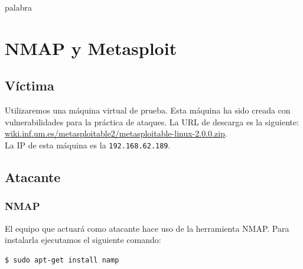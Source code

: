 \documentclass[a4,12pt,onecolum]{article}
\begin{document}

\thispagestyle{empty}
\textcolor[rgb]{1.00,1.00,1.00}{palabra} %
\newpage

\setcounter{page}{3}


\newpage
\tableofcontents 		%
\newpage




\clearpage

\section{NMAP y Metasploit}

\subsection{Víctima}
Utilizaremos una máquina virtual de prueba. Esta máquina ha sido creada con vulnerabilidades para la práctica de ataques. La URL de descarga es la siguiente: \url{wiki.inf.um.es/metasploitable2/metasploitable-linux-2.0.0.zip}. \\

La IP de esta máquina es la \texttt{192.168.62.189}.

\subsection{Atacante}

\subsubsection{NMAP}

El equipo que actuará como atacante hace uso de la herramienta NMAP. Para instalarla ejecutamos el siguiente comando:

\begin{verbatim}
$ sudo apt-get install namp
\end{verbatim}
\end{document}
